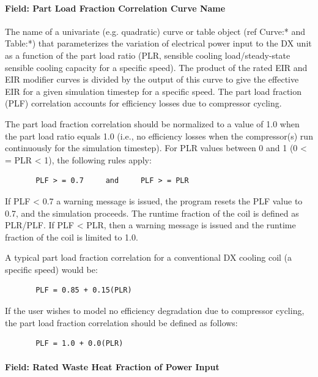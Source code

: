 \paragraph{Field: Part Load Fraction Correlation Curve Name}

The name of a univariate (e.g. quadratic) curve or table object (ref Curve:* and Table:*) that parameterizes the variation of electrical power input to the DX unit as a function of the part load ratio (PLR, sensible cooling load/steady-state sensible cooling capacity for a specific speed). The product of the rated EIR and EIR modifier curves is divided by the output of this curve to give the effective EIR for a given simulation timestep for a specific speed. The part load fraction (PLF) correlation accounts for efficiency losses due to compressor cycling.

The part load fraction correlation should be normalized to a value of 1.0 when the part load ratio equals 1.0 (i.e., no efficiency losses when the compressor(s) run continuously for the simulation timestep). For PLR values between 0 and 1 (0 \textless{} = PLR \textless{} 1), the following rules apply:

\begin{lstlisting}
       PLF > = 0.7     and     PLF > = PLR
\end{lstlisting}

If PLF \textless{} 0.7 a warning message is issued, the program resets the PLF value to 0.7, and the simulation proceeds. The runtime fraction of the coil is defined as PLR/PLF. If PLF \textless{} PLR, then a warning message is issued and the runtime fraction of the coil is limited to 1.0.

A typical part load fraction correlation for a conventional DX cooling coil (a specific speed) would be:

\begin{lstlisting}
       PLF = 0.85 + 0.15(PLR)
\end{lstlisting}

If the user wishes to model no efficiency degradation due to compressor cycling, the part load fraction correlation should be defined as follows:

\begin{lstlisting}
       PLF = 1.0 + 0.0(PLR)
\end{lstlisting}

\paragraph{Field: Rated Waste Heat Fraction of Power Input}\label{field-rated-waste-heat-fraction-of-power-input}

